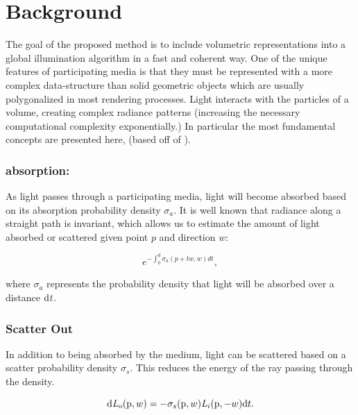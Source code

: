 \documentclass[runningheads]{llncs}
\begin{document}
\section{Background}
\label{background_sec}
The goal of the proposed method is to include volumetric representations into a global illumination algorithm in a fast and coherent way. One of the unique features of participating media is that they must be represented with a more complex data-structure than solid geometric objects which are usually polygonalized in most rendering processes.  Light interacts with the particles of a volume, creating complex radiance patterns (increasing the necessary computational complexity exponentially.) In particular the most fundamental concepts are presented here,  (based off of  \cite{pbrt}).

\subsubsection{absorption:}
As light passes through a participating media, light will become absorbed based on its absorption probability density $\sigma_{a}$. It is well known that radiance along a straight path is invariant, which allows us to estimate the amount of light absorbed or scattered given point $p$ and direction $w$:

\begin{equation}
e^{-\int_{0}^{d}\sigma_{a} (p+t\mathit{w},\mathit{w})d\mathit{t}},
\label{siga_eq}
\end{equation}

where $\sigma_{a}$ represents the probability density that light will be absorbed over a distance $\textup{d}\mathit{t}$.

\subsubsection{Scatter Out}
In addition to being absorbed by the medium, light can be scattered based on a scatter probability density $\sigma_{s}$.  This reduces the energy of the ray passing through the density.

\begin{equation}
\textup{d}\mathit{L}_{o}(\textup{p},w) = -\sigma_{s}(\textup{p},w) \mathit{L}_{i}(\textup{p},-w)\textup{d}t.
\label{sigs_eq}
\end{equation}
\end{document}

